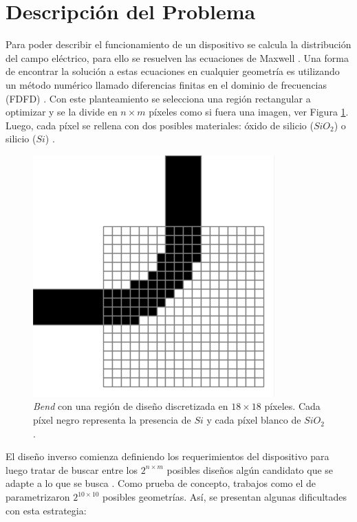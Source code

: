 \section{Descripción del Problema}


Para poder describir el funcionamiento de un dispositivo se calcula la distribución del campo eléctrico, para ello se resuelven las ecuaciones
de Maxwell \citep{Schneider2019}. 
Una forma de encontrar la solución a estas ecuaciones en cualquier geometría es utilizando un método numérico llamado diferencias finitas en el dominio de frecuencias (FDFD) \citep{Su2020}.
Con este planteamiento se selecciona una región rectangular a optimizar y se la divide  en $n \times m$  píxeles como si fuera una imagen, ver Figura \ref{fig:bend-discretization}. 
Luego, cada píxel se rellena con dos posibles materiales: óxido de silicio ($SiO_2$) o silicio ($Si$) \citep{Molesky2018}.

\begin{figure}[ht]
  \centering
  \includegraphics[scale=0.6]{image/introduction/bend-discretization.png}
  \caption{\emph{Bend} con una región de diseño discretizada en $18 \times 18$
  píxeles. Cada píxel negro representa la presencia de $Si$ y cada píxel blanco
  de $SiO_2$.}
  \label{fig:bend-discretization}
\end{figure}

El diseño inverso comienza definiendo los requerimientos del dispositivo para luego tratar de buscar entre los $2^{n \times m}$ posibles diseños algún candidato que se adapte a lo que se busca \citep{Su2020, Molesky2018}.
Como prueba de concepto, trabajos como el de \cite{Malheiros-Silveira2020} parametrizaron $2^{10 \times 10}$ posibles geometrías.
Así, se presentan algunas dificultades con esta estrategia:


